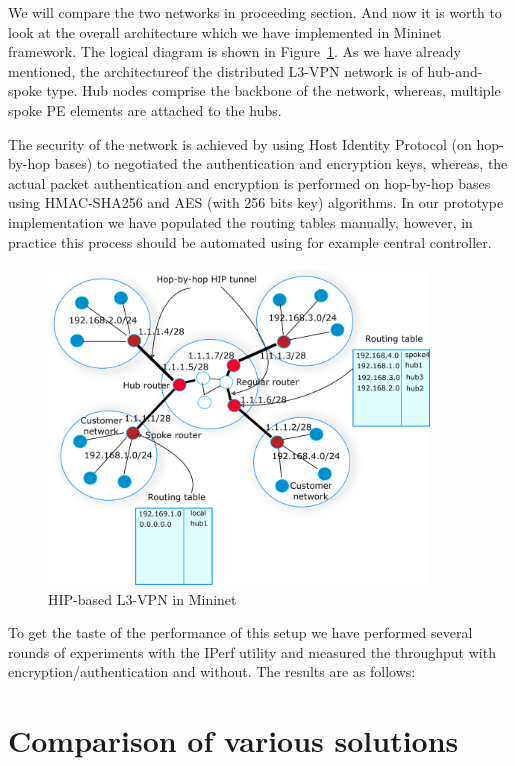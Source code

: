 We will compare the two networks in proceeding section. And now it is worth
to look at the overall architecture which we have implemented in
Mininet framework. The logical diagram is shown in Figure~\ref{fig:l3vpn}. 
As we have already mentioned, the architectureof the distributed 
L3-VPN network is of hub-and-spoke type. Hub nodes comprise the backbone of the network, whereas,
multiple spoke PE elements are attached to the hubs. 

The security of the network is achieved by using Host Identity Protocol (on hop-by-hop bases) to negotiated
the authentication and encryption keys, whereas, the actual packet authentication
and encryption is performed on hop-by-hop bases using HMAC-SHA256
and AES (with 256 bits key) algorithms. In our prototype implementation we 
have populated the routing tables manually, however, in practice this 
process should be automated using for example central controller. 

\begin{figure}[!ht]
    \centering
    \includegraphics[width=0.9\textwidth]{graphics/l3-vpn.png}
    \caption{HIP-based L3-VPN in Mininet}
    \label{fig:l3vpn}
\end{figure}

To get the taste of the performance of this setup we have performed 
several rounds of experiments with the IPerf utility and measured
the throughput with encryption/authentication and without. The results 
are as follows:

\section{Comparison of various solutions}

